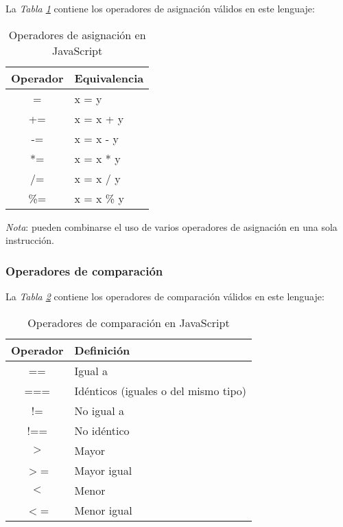 La \textit{Tabla \ref{tab: 3}} contiene los operadores de asignación válidos en este lenguaje:
\begin{table}[H]
    \begin{center}
        \caption{Operadores de asignación en JavaScript}
        \label{tab: 3}
        \begin{tabular}{c l}
            \hline
            \textbf{Operador}&\textbf{Equivalencia} \\
            \hline
            = & x = y \\
            += & x = x + y \\
            -= & x = x - y \\
            *= & x = x * y \\
            /= & x = x / y \\
            \%= & x = x \% y \\
            \hline
        \end{tabular}
    \end{center}
\end{table}

\textit{Nota}: pueden combinarse el uso de varios operadores de asignación en una sola instrucción.


\subsubsection{Operadores de comparación}

La \textit{Tabla \ref{tab: 4}} contiene los operadores de comparación válidos en este lenguaje:
\begin{table}[H]
    \begin{center}
        \caption{Operadores de comparación en JavaScript}
        \label{tab: 4}
        \begin{tabular}{c l}
            \hline
            \textbf{Operador}&\textbf{Definición} \\
            \hline
            == & Igual a \\
            === & Idénticos (iguales o del mismo tipo) \\
            != & No igual a \\
            !== & No idéntico \\
            $>$ & Mayor \\
            $>$= & Mayor igual \\
            $<$ & Menor \\
            $<$= & Menor igual \\
            \hline
        \end{tabular}
    \end{center}
\end{table}

